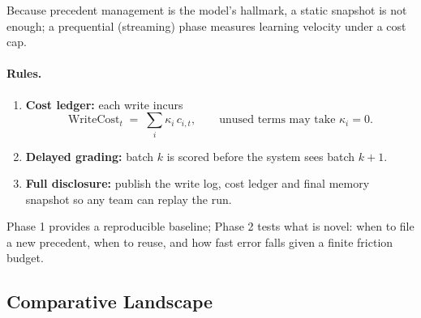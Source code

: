 \documentclass[11pt]{article}
\newcommand{\WriteCost}{\mathrm{WriteCost}}
\begin{document}
Because precedent management is the model's hallmark, a static snapshot is not enough; a
prequential (streaming) phase measures learning velocity under a cost cap.

\begin{center}
\end{center}

\paragraph{Rules.}
\begin{enumerate}\itemsep=2pt
\item \textbf{Cost ledger:} each write incurs
\[
\WriteCost_t \;=\; \sum_i \kappa_i\,c_{i,t},\qquad
\text{unused terms may take }\kappa_i=0.
\]
\item \textbf{Delayed grading:} batch \(k\) is scored before the system sees batch \(k{+}1\).
\item \textbf{Full disclosure:} publish the write log, cost ledger and final memory snapshot so any team can replay the run.
\end{enumerate}

Phase 1 provides a reproducible baseline; Phase 2 tests what is novel: when to
file a new precedent, when to reuse, and how fast error falls given a finite friction budget.

\subsection{\quad Comparative Landscape}
\end{document}
